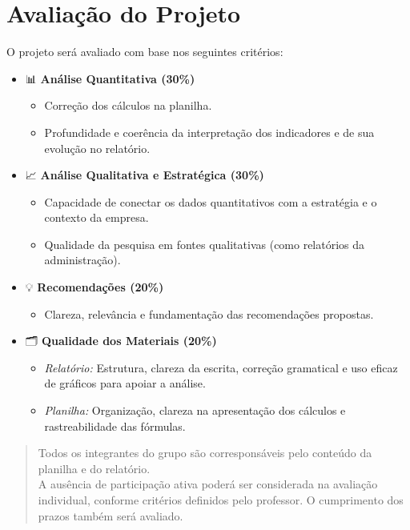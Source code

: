 \documentclass[
  a4paper,
]{book}
\providecommand{\tightlist}{%
  \setlength{\itemsep}{0pt}\setlength{\parskip}{0pt}}\usepackage{longtable,booktabs,array}
\newcommand{\emojitext}[1]{{\emoji #1}}
\begin{document}
\section{Avaliação do Projeto 🧮}\label{avaliauxe7uxe3o-do-projeto}

O projeto será avaliado com base nos seguintes critérios:

\begin{itemize}
\item
  \emojitext{📊} \textbf{Análise Quantitativa (30\%)}

  \begin{itemize}
  \tightlist
  \item
    Correção dos cálculos na planilha.
  \item
    Profundidade e coerência da interpretação dos indicadores e de sua
    evolução no relatório.
  \end{itemize}
\item
  \emojitext{📈} \textbf{Análise Qualitativa e Estratégica (30\%)}

  \begin{itemize}
  \tightlist
  \item
    Capacidade de conectar os dados quantitativos com a estratégia e o
    contexto da empresa.
  \item
    Qualidade da pesquisa em fontes qualitativas (como relatórios da
    administração).
  \end{itemize}
\item
  \emojitext{💡} \textbf{Recomendações (20\%)}

  \begin{itemize}
  \tightlist
  \item
    Clareza, relevância e fundamentação das recomendações propostas.
  \end{itemize}
\item
  \emojitext{🗂️} \textbf{Qualidade dos Materiais (20\%)}

  \begin{itemize}
  \tightlist
  \item
    \emph{Relatório:} Estrutura, clareza da escrita, correção gramatical
    e uso eficaz de gráficos para apoiar a análise.
  \item
    \emph{Planilha:} Organização, clareza na apresentação dos cálculos e
    rastreabilidade das fórmulas.
  \end{itemize}
\end{itemize}

\begin{quote}
Todos os integrantes do grupo são corresponsáveis pelo conteúdo da
planilha e do relatório.\\
A ausência de participação ativa poderá ser considerada na avaliação
individual, conforme critérios definidos pelo professor. O cumprimento
dos prazos também será avaliado.
\end{quote}
\end{document}
